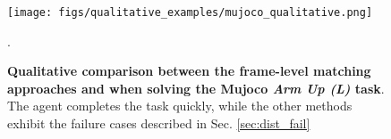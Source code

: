 \begin{figure*}[h]
    \centering
    \texttt{[image: figs/qualitative\_examples/mujoco\_qualitative.png]}
    \caption{\small \textbf{Qualitative comparison between the frame-level matching approaches and \orca{} when solving the Mujoco \textit{Arm Up (L)} task}. The \orca{} agent completes the task quickly, while the other methods exhibit the failure cases described in Sec. \ref{sec:dist_fail}}.
    \label{fig:humanoid_qualitative}
\end{figure*}
